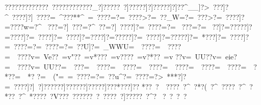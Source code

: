 {{{{{{{{{{{{{{{{{{{{{{{{{{{{{{{{{{{{{{{{{{{{{{{{{{{{{{{{{{{{{{{{{{{{{{{{{{{{{{{{{{{{{{{{{{{{{{{{{{{{{{{{{{{{{{{{{{{{{{{{{{{{{{{{{{{{{{{{{{{{{{{{{{{{{{{{{{{{{{{{{{{{{{{{{{{{{{{{{{{{{{{{{{{{{{{{{{{{{{{{{{{{{{{{{{{{{{{{{{{{{{{{{{{{{{{{{{{{{{{{{{{{{{{{{{{{{{{{{{{{{{{{{{{{{{{{{{{{{{{{{{{{{{{{{{{{{{{{{{{{{{{{{{{{{{{{{{{{{{{{{{{{{{{{{{{{{{{{{{{{{{{{{{{{{{{{{{{{{{{{{{{{{{{{{{{{{{{{{{{{{{{{{{{{{{{{{{{{{{{{{{{{{{{{{{{{{{{{{{{{{{{{{{{{{{{{{{{{{{{{{{{{{{{{{{{{{{{{{{{{{{{{{{{{{{{{{{{{{{{{{{{{{{{{{{{{{{{{{{{{{{{{{{{{{{{{{{{{{{{{{{{{{{{{{{{{{{{{{{{{{{{{{{{{{{{{{{{{{{{{{{{{{{{{{{{{{{{{{{{{{{{{{{{{{{{{{{{{{{{{{{{{{{{{{{{{{{{{{{{{{{{{{{{{{{{{{{{{{{{{{{{{{{{{{{{{{{{{{{{{{{{{{{{{{{{{{{{{{{{{{{{{{{{{{{{{{{{{{{{{{{{{{{{{{{{{{{{{{{{{{{{{{{{{{{{{{{{{{{{{{{{{{{{{{{{{{{{{{{{{{{{{{{{{{{{{{{{{{{{{{{{{{{{{{{{{{{{{{{{{{{{{{{{{{{{{{{{{{{{{{{{{{{{{{{{{{{{{{{{{{{{{{{{{{{{{{{{{{{{{{{{{{{{{{{{{{{{{{{{{{{{{{{{{{{{{{{{{{{{{{{{{{{{{{{{{{{{{{{{{{{{{{{{{{{{{{{{{{{{{{{{{{{{{{{{{{{{{{{{{{{{{{{{{{{{{{{{{{{{{{{{{{{{{{{{{{{{{{{{{{{{{{{{{{{{{{{{{{{{{{{{{{{{{{{{{{{{{{{{{{{{{{{{{{{{{{{{{{{{{{{{{{{{{{{{{{{{{{{{{{{{{{{{{{{{{{{{{{{{{{{{{{{{{{{{{{{{{{{{{{{{{{{{{{{{{{{{{{{{{{{{{{{{{{{{{{{{{{{{{{{{{{{{{{{{{{{{{{{{{{{{{{{{{{{{{{{{{{{{{{{{{{{{{{{{{{{{{{{{{{{{{{{{{{{{{{{{{{{{{{{{{{{{{{{{{{{{{{{{{{{{{{{{{{{{{{{{{{{{{{{{{{{{{{{{{{{{{{{{{{{{{{{{{{{{{{{{{{{{{{{{{{{{{{{{{{{{{{{{{{{{{{{{{{{{{{{{{{{{{{{{{{{{{{{{{{{{{{{{{{{{{{{{{{{{{{{{{{{{{{{{{{{{{{{{{{{{{{{{{{{{{{{{{{{{{{{{{{{{{{{{{{{{{{{{{{{{{{{{{{{{{{{{{{{{{{{{{{{{{{{{{{{{{{{{{{{{{{{{{{{{{{{{{{{{{{{{{{{{{{{{{{{{{{{{{{{{{{{{{{{{{{{{{{{{{{{{{{{{{{{{{{{{{{{{{{{{{{{{{{{{{{{{{{{{{{{{{{{{{{{{{{{{{{{{{{{{{{{{{{{{{{{{{{{{{{{{{{{{{{{{{{{{{{{{{{{{{{{{{{{{{{{{{{{{{{{{{{{{{{{{{{{{{{{{{{{{{{{{{{{{{{{{{{{{{{{{{{{{{{{{{{{{{{{{{{{{{{{{{{{{{{{{{{{{{{{{{{{{{{{{{{{{{{{{{{{{{{{{{{{{{{{{{{{{{{{{{{{{{{{{{{{{{{{{{{{{{{{{{{{{{{{{{{{{{{{{{{{{{{{{{{{{{{{{{{{{{{{{{{{{{{{{{{{{{{{{{{{{{{{{{{{{{{{{{{{{{{{{{{{{{{{{{{{{{{{{{{{{{{{{{{{{{{{{{{{{{{{{{{{{{{{{{{{{{{{{{{{{{{{{{{{{{{{{{{{{{{{{{{{{{{{{{{{{{{{{{{{{{{{{{{{{{{{{{{{{{{{{{{{{{{{{{{{{{{{{{{{{{{{{{{{{{{{{{{{{{{{{{{{{{{{{{{{{{{{{{{{{{{{{{{{{{{{{{{{{{{{{{{{{{{{{{{{{{{{{{{{{{{{{{{{{{{{{{{{{{{{{{{{{{{{{{{{{{{{{{{{{{{{{{{{{{{{{{{{{{{{{{{{{{{{{{{{{{{{{{{{{{{{{{{{{{{{{{{{{{{{{{{{{{{{{{{{{{{{{{{{{{{{{{{{{{{{{{{{{{{{{{{{{{{{{{{{{{{{{{{{{{{{{{{{{{{{{{{{{{{{{{{{{{{{{{{{{{{{{{{{{{{{{{{{{{{{{{{{{{{{{{{{{{{{{{{{{{{{?????????????~???}???????}??_}?]?????~?]?????]?]?????]?]??^__]?>~ ???]?^~????]?]~????=~^???**^~=~????=?=~????>?=~??_W=?=~???>?=~????]?=????w=?^~
???=?]~???=?^~?? =?]~????]?=~????=?=~
???=?=~  ??]?=?????]?=????]?=~????]?=~????]?=? ???]?=?????]?=~????]?=?????]?=~*???]?=~????]?=~????=?=~????=?=~??U]?=~_WWU=~~????=~~????=~~????v=~Ve??~=v"??~=v*???~=v????~=v?*??~=v 
??v=~UU??v=~eie?=~~????v=~UU??=~~???=~~????=~~????=~~????=~~????=~~????=~~????=~~?*??=~~*?
?=~~ ("=~=~????=?=~?}?u^?=~????=?>~***?]?=~????]?]~  }?]?????}?]?????}?]?????]?}??*??}?]??%
*??~?~~????~?^~?*?(~?^~????~?^~?*??~?^~*???}?~?V???~?}?????~?}~????~?]?????~?^?    ~?~?    ~?~?
 }}}}}}}}}}}}}}}}}}}}}}}}}}}}}}}}}}}}}}}}}}}}}}}}}}}}}}}}}}}}}}}}}}}}}}}}}}}}}}}}}}}}}}}}}}}}}}}}}}}}}}}}}}}}}}}}}}}}}}}}}}}}}}}}}}}}}}}}}}}}}}}}}}}}}}}}}}}}}}}}}}}}}}}}}}}}}}}}}}}}}}}}}}}}}}}}}}}}}}}}}}}}}}}}}}}}}}}}}}}}}}}}}}}}}}}}}}}}}}}}}}}}}}}}}}}}}}}}}}}}}}}}}}}}}}}}}}}}}}}}}}}}}}}}}}}}}}}}}}}}}}}}}}}}}}}}}}}}}}}}}}}}}}}}}}}}}}}}}}}}}}}}}}}}}}}}}}}}}}}}}}}}}}}}}}}}}}}}}}}}}}}}}}}}}}}}}}}}}}}}}}}}}}}}}}}}}}}}}}}}}}}}}}}}}}}}}}}}}}}}}}}}}}}}}}}}}}}}}}}}}}}}}}}}}}}}}}}}}}}}}}}}}}}}}}}}}}}}}}}}}}}}}}}}}}}}}}}}}}}}}}}}}}}}}}}}}}}}}}}}}}}}}}}}}}}}}}}}}}}}}}}}}}}}}}}}}}}}}}}}}}}}}}}}}}}}}}}}}}}}}}}}}}}}}}}}}}}}}}}}}}}}}}}}}}}}}}}}}}}}}}}}}}}}}}}}}}}}}}}}}}}}}}}}}}}}}}}}}}}}}}}}}}}}}}}}}}}}}}}}}}}}}}}}}}}}}}}}}}}}}}}}}}}}}}}}}}}}}}}}}}}}}}}}}}}}}}}}}}}}}}}}}}}}}}}}}}}}}}}}}}}}}}}}}}}}}}}}}}}}}}}}}}}}}}}}}}}}}}}}}}}}}}}}}}}}}}}}}}}}}}}}}}}}}}}}}}}}}}}}}}}}}}}}}}}}}}}}}}}}}}}}}}}}}}}}}}}}}}}}}}}}}}}}}}}}}}}}}}}}}}}}}}}}}}}}}}}}}}}}}}}}}}}}}}}}}}}}}}}}}}}}}}}}}}}}}}}}}}}}}}}}}}}}}}}}}}}}}}}}}}}}}}}}}}}}}}}}}}}}}}}}}}}}}}}}}}}}}}}}}}}}}}}}}}}}}}}}}}}}}}}}}}}}}}}}}}}}}}}}}}}}}}}}}}}}}}}}}}}}}}}}}}}}}}}}}}}}}}}}}}}}}}}}}}}}}}}}}}}}}}}}}}}}}}}}}}}}}}}}}}}}}}}}}}}}}}}}}}}}}}}}}}}}}}}}}}}}}}}}}}}}}}}}}}}}}}}}}}}}}}}}}}}}}}}}}}}}}}}}}}}}}}}}}}}}}}}}}}}}}}}}}}}}}}}}}}}}}}}}}}}}}}}}}}}}}}}}}}}}}}}}}}}}}}}}}}}}}}}}}}}}}}}}}}}}}}}}}}}}}}}}}}}}}}}}}}}}}}}}}}}}}}}}}}}}}}}}}}}}}}}}}}}}}}}}}}}}}}}}}}}}}}}}}}}}}}}}}}}}}}}}}}}}}}}}}}}}}}}}}}}}}}}}}}}}}}}}}}}}}}}}}}}}}}}}}}}}}}}}}}}}}}}}}}}}}}}}}}}}}}}}}}}}}}}}}}}}}}}}}}}}}}}}}}}}}}}}}}}}}}}}}}}}}}}}}}}}}}}}}}}}}}}}}}}}}}}}}}}}}}}}}}}}}}}}}}}}}}}}}}}}}}}}}}}}}}}}}}}}}}}}}}}}}}}}}}}}}}}}}}}}}}}}}}}}}}}}}}}}}}}}}}}}}}}}}}}}}}}}}}}}}}}}}}}}}}}}}}}}}}}}}}}}}}}}}}}}}}}}}}}}}}}}}}}}}}}}}}}}}}}}}}}}}}}}}}}}}}}}}}}}}}}}}}}}}}}}}}}}}}}}}}}}}}}}}}}}}}}}}}}}}}}}}}}}}}}}}}}}}}}}}}}}}}}}}}}}}}}}}}}}}}}}}}}}}}}}}}}}}}}}}}}}}}}}}}}}}}}}}}}}}}}}}}}}}}}}}}}}}}}}}}}}}}}}}}}}}}}}}}}}}}}}}}}}}}}}}}}}}}}}}}}}}}}}}}}}}}}}}}}}}}}}}}}}}}}}}}}}}}}}}}}}}}}}}}}}}}}}}}}}}}}}}}}}}}}}}}}}}}}}}}}}}}}}}}}}}}}}}}}}}}}}}}}}}}}}}}}}}}}}}}}}}}}}}}}}}}}}}}}}}}}}}}}}}}}}}}}}}}}}}}}}}}}}}}}}}}}}}}}}}}}}}}}}}}}}}}}}}}}}}}}}}}}}}}}}}}}}}}}}}}}}}}}}}}}}}}}}}}}}}}}}}}}}}}}}}}}}}}}}}}}}}}}}}}}}}}}}}}}}}}}}}}}}}}}}}}}}}}}}}}}}}}}}}}}}}}}}}}}}}}}}}}}}}}}}}}}}}}}}}}}}}}}}}}}}}}}}}}}}}}}}}}}}}}}}}}}}}}}}}}}}}}}}}}}}}}}}}}
